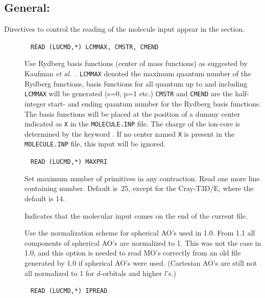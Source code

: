 \subsection{General: }\label{sec:herrdn}

Directives to control the reading of the molecule input appear in the
 section.
\begin{description}
\item[]\verb| |\newline
\verb|READ (LUCMD,*) LCMMAX, CMSTR, CMEND|

Use Rydberg basis functions
 (center of mass functions) as suggested by
Kaufman {\it et al.\/}~\cite{kkwbmjjpbamop22}. \verb|LCMMAX| denoted
the maximum quantum number of the Rydberg functions, basis functions
for all quantum up to and including \verb|LCMMAX| will be generated
(s=0, p=1 etc.) \verb|CMSTR| and \verb|CMEND| are the half-integer
start- and ending quantum number for the Rydberg basis functions. The
basis functions will be placed at the position of a dummy center
indicated as \verb|X| in the \verb|MOLECULE.INP| file. The charge of
the ion-core is determined by the keyword . If no center
named \verb|X| is present in the \verb|MOLECULE.INP| file, this input
will be ignored.

\item[]\verb| |\newline
\verb|READ (LUCMD,*) MAXPRI|

Set maximum number of primitives in any
contraction.  Read one more line containing number.  Default
is~25, except for the Cray-T3D/E, where the default is 14.

\item[] Indicates that the molecular input comes on the
end of the current file. 

\item[] Use the normalization scheme for spherical AO's used in {\dalton} 1.0.
From {\dalton} 1.1 all components of spherical AO's are normalized to 1.
This was not the case in {\dalton} 1.0, and this option is needed to read 
MO's correctly from an old file generated by {\dalton} 1.0 if spherical AO's were used.
(Cartesian AO's are still not all normalized to 1 for $d$-orbitals and higher $l$'s.)

\item[]\verb| |\newline
\verb|READ (LUCMD,*) IPREAD|


\end{description}
